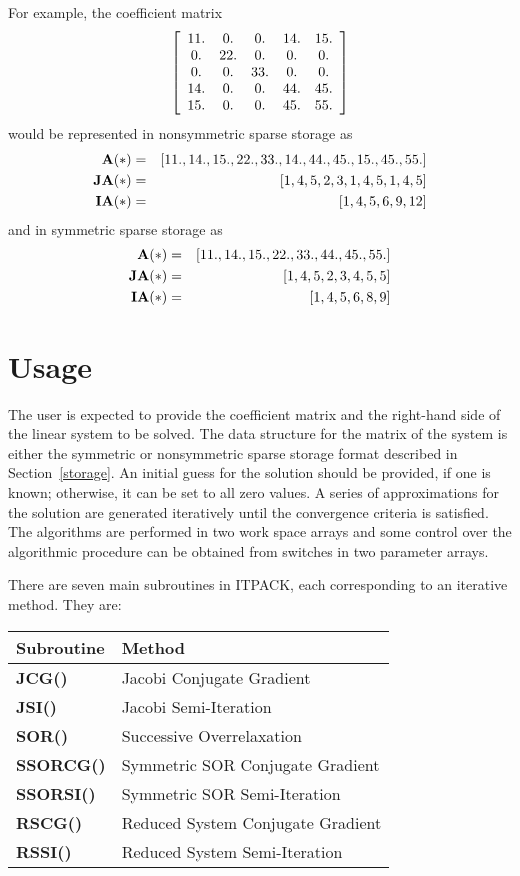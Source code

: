 For example, the coefficient matrix
\[ \left[ \begin{array}{ccccc} 
        11. &  0. &  0. & 14. & 15. \\
         0. & 22. &  0. &  0. &  0. \\
         0. &  0. & 33. &  0. &  0. \\
        14. &  0. &  0. & 44. & 45. \\
        15. &  0. &  0. & 45. & 55. 
  \end{array} \right] \]
would be represented in nonsymmetric sparse storage as
\begin{eqnarray*}
 {\bf A(*)}  & = & [11.,14.,15.,22.,33.,14.,44.,45.,15.,45.,55.] \\
 {\bf JA(*)} & = & [1,4,5,2,3,1,4,5,1,4,5] \\
 {\bf IA(*)} & = & [1,4,5,6,9,12] 
\end{eqnarray*}
and in symmetric sparse storage as
\begin{eqnarray*} 
 {\bf A(*)}  & = & [11.,14.,15.,22.,33.,44.,45.,55.] \\
 {\bf JA(*)} & = & [1, 4, 5, 2, 3, 4, 5, 5] \\
 {\bf IA(*)} & = & [1, 4, 5, 6, 8, 9]
\end{eqnarray*}
 
\section{Usage}
\label{usage}
 
The user is expected to provide the coefficient matrix and the
right-hand side of the linear system to be solved.  The data structure
for the matrix of the system is either the symmetric or nonsymmetric
sparse storage format described in Section~\ref{storage}.  An initial
guess for the solution should be provided, if one is known; otherwise,
it can be set to all zero values.  A series of approximations for the
solution are generated iteratively until the convergence criteria is
satisfied.  The algorithms are performed in two work space arrays and
some control over the algorithmic procedure can be obtained from
switches in two parameter arrays.
 
There are seven main subroutines in ITPACK, each corresponding to an
iterative method.  They are: 
 
\bigskip
\begin{tabular}{ll} \hline
  Subroutine & Method \\ \hline
  {\bf JCG()}    & Jacobi Conjugate Gradient \\
  {\bf JSI()}    & Jacobi Semi-Iteration \\
  {\bf SOR()}    & Successive Overrelaxation \\
  {\bf SSORCG()} & Symmetric SOR Conjugate Gradient \\
  {\bf SSORSI()} & Symmetric SOR Semi-Iteration \\
  {\bf RSCG()}   & Reduced System Conjugate Gradient \\
  {\bf RSSI()}   & Reduced System Semi-Iteration \\ \hline
\end{tabular}
 
